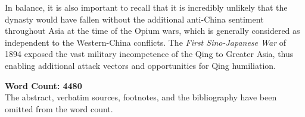 \documentclass[a4paper,oneside]{article}
\newcommand{\wordcount}{4480}
\begin{document}
In balance, it is also important to recall that it is incredibly unlikely that
the dynasty would have fallen without the additional anti-China sentiment
throughout Asia at the time of the Opium wars, which is generally considered as
independent to the Western-China conflicts. The \textit{First Sino-Japanese War}
of 1894 exposed the vast military incompetence of the Qing to Greater Asia, thus
enabling additional attack vectors and opportunities for Qing humiliation.

\vfill
\noindent\ignorespacesafterend%
\textbf{Word Count: \wordcount}\\[1em]
The abstract, verbatim sources, footnotes, and the bibliography have been
omitted from the word count.

\pagebreak
\setcounter{tocdepth}{1}
\printbibliography[title={Cited Works}, heading=bibintoc]
\end{document}
